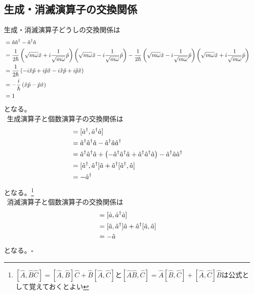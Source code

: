 \documentclass{jsarticle}  %
\numberwithin{equation}{section} %
\numberwithin{figure}{section}
\begin{document}
\subsection{生成・消滅演算子の交換関係}
    生成・消滅演算子どうしの交換関係は
    \begin{align}
        [\hat{a},\hat{a}^\dagger] &= \hat{a}\hat{a}^\dagger - \hat{a}^\dagger \hat{a} \notag \\
        &= \frac{1}{2\hbar}\left( \sqrt{m\omega} \hat{x} +i \frac{1}{\sqrt{m\omega}} \hat{p}\right)\left( \sqrt{m\omega} \hat{x} -i \frac{1}{\sqrt{m\omega}} \hat{p}\right) - \frac{1}{2\hbar}\left( \sqrt{m\omega} \hat{x} -i \frac{1}{\sqrt{m\omega}} \hat{p}\right)\left( \sqrt{m\omega} \hat{x} +i \frac{1}{\sqrt{m\omega}} \hat{p}\right) \notag \\
        &= \frac{1}{2\hbar}\left( -i\hat{x}\hat{p} + i\hat{p}\hat{x} -i\hat{x}\hat{p} + i\hat{p}\hat{x} \right) \notag \\
        &= -\frac{i}{\hbar}\left( \hat{x}\hat{p} - \hat{p}\hat{x} \right) \notag \\
        &= 1
    \end{align}
    となる。\\
    $\ \ $生成演算子と個数演算子の交換関係は
    \begin{align}
        [\hat{a}^\dagger,\hat{N}] &= [\hat{a}^\dagger,\hat{a}^\dagger \hat{a}] \notag \\
        &= \hat{a}^\dagger \hat{a}^\dagger \hat{a} - \hat{a}^\dagger \hat{a}\hat{a}^\dagger \notag \\
        &= \hat{a}^\dagger \hat{a}^\dagger \hat{a} +\left( -\hat{a}^\dagger \hat{a}^\dagger \hat{a} + \hat{a}^\dagger \hat{a}^\dagger \hat{a}  \right)- \hat{a}^\dagger \hat{a}\hat{a}^\dagger \notag \\
        &= [\hat{a}^\dagger,\hat{a}^\dagger]\hat{a} + \hat{a}^\dagger [\hat{a}^\dagger,\hat{a}] \notag \\
        &= -\hat{a}^\dagger
    \end{align}
    となる。\footnote{$[\hat{A},\hat{B}\hat{C}]=[\hat{A},\hat{B}]\hat{C} + \hat{B}[\hat{A},\hat{C}]と[\hat{A}\hat{B},\hat{C}] = \hat{A}[\hat{B},\hat{C}] + [\hat{A},\hat{C}]\hat{B}$は公式として覚えておくとよい}\\
    $\ \ $消滅演算子と個数演算子の交換関係は
    \begin{align}
        [\hat{a},\hat{N}] &= [\hat{a},\hat{a}^\dagger \hat{a}] \notag \\
        &= [\hat{a},\hat{a}^\dagger]\hat{a} + \hat{a}^\dagger [\hat{a},\hat{a}] \notag \\
        &= -\hat{a}
    \end{align}
    となる。$\square$
\end{document}
